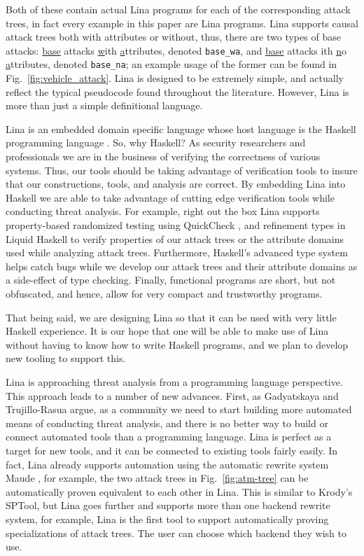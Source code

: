 Both of these contain actual Lina programs for each of the
corresponding attack trees, in fact every example in this paper are
Lina programs. Lina supports causal attack trees both with attributes
or without, thus, there are two types of base attacks:
\underline{base} attacks \underline{w}ith \underline{a}ttributes,
denoted \verb!base_wa!, and \underline{base} attacks ith
\underline{n}o \underline{a}ttributes, denoted \verb!base_na!; an
example usage of the former can be found in
Fig.~\ref{fig:vehicle_attack}.  Lina is designed to be extremely
simple, and actually reflect the typical pseudocode found throughout
the literature.  However, Lina is more than just a simple definitional
language.

Lina is an embedded domain specific language whose host language is
the Haskell programming language \cite{jones2003haskell}.  So, why
Haskell?  As security researchers and professionals we are in the
business of verifying the correctness of various systems. Thus, our
tools should be taking advantage of verification tools to insure that
our constructions, tools, and analysis are correct.  By embedding Lina
into Haskell we are able to take advantage of cutting edge
verification tools while conducting threat analysis.  For example,
right out the box Lina supports property-based randomized testing
using QuickCheck \cite{Claessen:2011:QLT:1988042.1988046}, and
refinement types in Liquid Haskell
\cite{Vazou:2014:RTH:2692915.2628161} to verify properties of our
attack trees or the attribute domains used while analyzing attack
trees.  Furthermore, Haskell's advanced type system helps catch bugs
while we develop our attack trees and their attribute domains as a
side-effect of type checking.  Finally, functional programs are short,
but not obfuscated, and hence, allow for very compact and trustworthy
programs.

That being said, we are designing Lina so that it can be used with
very little Haskell experience.  It is our hope that one will be able
to make use of Lina without having to know how to write Haskell
programs, and we plan to develop new tooling to support this.

Lina is approaching threat analysis from a programming language
perspective.  This approach leads to a number of new advances.  First,
as Gadyatskaya and Trujillo-Rasua \cite{10.1007/978-3-319-74860-3_9}
argue, as a community we need to start building more automated means
of conducting threat analysis, and there is no better way to build or
connect automated tools than a programming language.  Lina is perfect
as a target for new tools, and it can be connected to existing tools
fairly easily.  In fact, Lina already supports automation using the
automatic rewrite system Maude \cite{clavel2005maude}, for example,
the two attack trees in Fig.~\ref{fig:atm-tree} can be automatically
proven equivalent to each other in Lina.  This is similar to Krody's
\cite{Kordy2017} SPTool, but Lina goes further and supports more than
one backend rewrite system, for example, Lina is the first tool to
support automatically proving specializations of attack trees.  The
user can choose which backend they wish to use.

